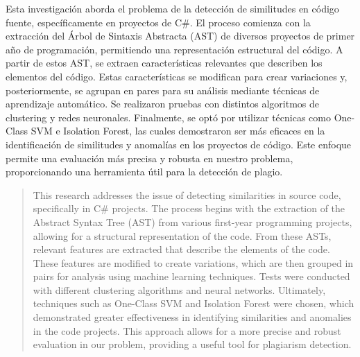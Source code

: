 \begin{resumen}
 Esta investigación aborda el problema de la detección de similitudes en código fuente, específicamente en proyectos de C\#. El proceso comienza con la extracción del Árbol de Sintaxis Abstracta (AST) de diversos proyectos de primer año de programación, permitiendo una representación estructural del código. A partir de estos AST, se extraen características relevantes que describen los elementos del código. Estas características se modifican para crear variaciones y, posteriormente, se agrupan en pares para su análisis mediante técnicas de aprendizaje automático. Se realizaron pruebas con distintos algoritmos de clustering y redes neuronales. Finalmente, se optó por utilizar técnicas como One-Class SVM e Isolation Forest, las cuales demostraron ser más eficaces en la identificación de similitudes y anomalías en los proyectos de código. Este enfoque permite una evaluación más precisa y robusta en nuestro problema, proporcionando una herramienta útil para la detección de plagio.
\end{resumen}

\begin{abstract}
	This research addresses the issue of detecting similarities in source code, specifically in C# projects. The process begins with the extraction of the Abstract Syntax Tree (AST) from various first-year programming projects, allowing for a structural representation of the code. From these ASTs, relevant features are extracted that describe the elements of the code. These features are modified to create variations, which are then grouped in pairs for analysis using machine learning techniques. Tests were conducted with different clustering algorithms and neural networks. Ultimately, techniques such as One-Class SVM and Isolation Forest were chosen, which demonstrated greater effectiveness in identifying similarities and anomalies in the code projects. This approach allows for a more precise and robust evaluation in our problem, providing a useful tool for plagiarism detection.
\end{abstract}